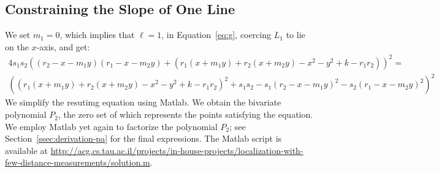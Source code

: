\subsection{Constraining the Slope of One Line}
\label{ssec:derivation-constraining-slope}
We set $m_1 = 0$, which implies that $\ell = 1$, in
Equation~\ref{eq:g}, coercing $L_1$ to lie on the $x$-axis, and get:
\begin{multline*}
  4 s_1 s_2 ((r_2 - x - m_1 y) (r_1 - x - m_2 y) + (r_1 (x + m_1 y) + r_2 (x + m_2 y) - x^2 - y^2 + k - r_1 r_2))^2 =\\
  ((r_1 (x + m_1 y) + r_2 (x + m_2 y) - x^2 - y^2 + k - r_1 r_2)^2 + s_1 s_2 -
    s_1 (r_2 - x - m_1 y)^2 - s_2 (r_1 - x - m_2 y)^2)^2
\end{multline*}
We simplify the resutimg equation using Matlab. We obtain the
bivariate polynomial $P_2$, the zero set of which represents the
points satisfying the equation. We employ Matlab yet again to
factorize the polynomial $P_2$; see Section~\ref{ssec:derivation-pa}
for the final expressions. The Matlab script is available at
\url{http://acg.cs.tau.ac.il/projects/in-house-projects/localization-with-few-distance-measurements/solution.m}.



